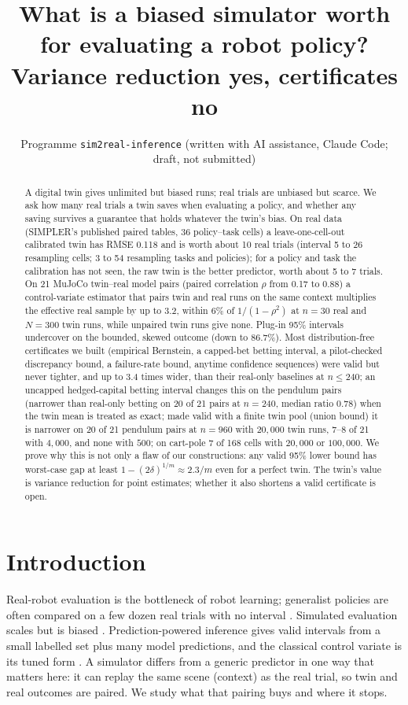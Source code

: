 \documentclass[11pt]{article}
\title{What is a biased simulator worth for evaluating a robot policy?\\ Variance reduction yes, certificates no}
\author{Programme \texttt{sim2real-inference} (written with AI assistance, Claude Code; draft, not submitted)}
\date{}
\begin{document}
\maketitle
\begin{abstract}
A digital twin gives unlimited but biased runs; real trials are unbiased but scarce. We ask how many real trials a twin saves when evaluating a policy, and whether any saving survives a guarantee that holds whatever the twin's bias. On real data (SIMPLER's published paired tables, 36 policy--task cells) a leave-one-cell-out calibrated twin has RMSE 0.118 and is worth about 10 real trials (interval 5 to 26 resampling cells; 3 to 54 resampling tasks and policies); for a policy and task the calibration has not seen, the raw twin is the better predictor, worth about 5 to 7 trials. On 21 MuJoCo twin--real model pairs (paired correlation $\rho$ from 0.17 to 0.88) a control-variate estimator that pairs twin and real runs on the same context multiplies the effective real sample by up to 3.2, within 6\% of $1/(1-\rho^2)$ at $n=30$ real and $N=300$ twin runs, while unpaired twin runs give none. Plug-in 95\% intervals undercover on the bounded, skewed outcome (down to 86.7\%). Most distribution-free certificates we built (empirical Bernstein, a capped-bet betting interval, a pilot-checked discrepancy bound, a failure-rate bound, anytime confidence sequences) were valid but never tighter, and up to 3.4 times wider, than their real-only baselines at $n\le 240$; an uncapped hedged-capital betting interval changes this on the pendulum pairs (narrower than real-only betting on 20 of 21 pairs at $n=240$, median ratio 0.78) when the twin mean is treated as exact; made valid with a finite twin pool (union bound) it is narrower on 20 of 21 pendulum pairs at $n=960$ with $20{,}000$ twin runs, 7--8 of 21 with $4{,}000$, and none with $500$; on cart-pole 7 of 168 cells with $20{,}000$ or $100{,}000$. We prove why this is not only a flaw of our constructions: any valid 95\% lower bound has worst-case gap at least $1-(2\delta)^{1/m}\approx 2.3/m$ even for a perfect twin. The twin's value is variance reduction for point estimates; whether it also shortens a valid certificate is open.
\end{abstract}

\section{Introduction}
Real-robot evaluation is the bottleneck of robot learning; generalist policies are often compared on a few dozen real trials with no interval \cite{kressgazit2024empirical}. Simulated evaluation scales but is biased \cite{li2024simpler}. Prediction-powered inference \cite{angelopoulos2023ppi,angelopoulos2023ppipp} gives valid intervals from a small labelled set plus many model predictions, and the classical control variate is its tuned form \cite{peherstorfer2018survey}. A simulator differs from a generic predictor in one way that matters here: it can replay the same scene (context) as the real trial, so twin and real outcomes are paired. We study what that pairing buys and where it stops.
\end{document}
